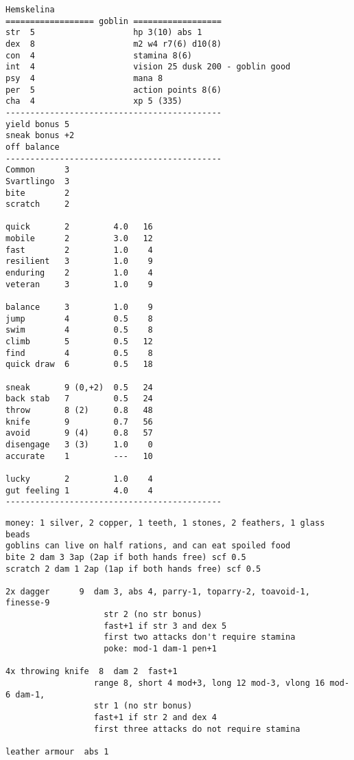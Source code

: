 \begin{verbatim}
\end{verbatim} \pagebreak[2] \begin{verbatim}
Hemskelina
================== goblin ==================
str  5                    hp 3(10) abs 1
dex  8                    m2 w4 r7(6) d10(8)
con  4                    stamina 8(6)
int  4                    vision 25 dusk 200 - goblin good
psy  4                    mana 8
per  5                    action points 8(6)
cha  4                    xp 5 (335)
--------------------------------------------
yield bonus 5
sneak bonus +2
off balance
--------------------------------------------
Common      3
Svartlingo  3
bite        2
scratch     2

quick       2         4.0   16
mobile      2         3.0   12
fast        2         1.0    4
resilient   3         1.0    9
enduring    2         1.0    4
veteran     3         1.0    9

balance     3         1.0    9
jump        4         0.5    8
swim        4         0.5    8
climb       5         0.5   12
find        4         0.5    8
quick draw  6         0.5   18

sneak       9 (0,+2)  0.5   24
back stab   7         0.5   24
throw       8 (2)     0.8   48
knife       9         0.7   56
avoid       9 (4)     0.8   57
disengage   3 (3)     1.0    0
accurate    1         ---   10

lucky       2         1.0    4
gut feeling 1         4.0    4
--------------------------------------------
\end{verbatim} \goodbreak \begin{verbatim}
money: 1 silver, 2 copper, 1 teeth, 1 stones, 2 feathers, 1 glass beads
goblins can live on half rations, and can eat spoiled food
bite 2 dam 3 3ap (2ap if both hands free) scf 0.5
scratch 2 dam 1 2ap (1ap if both hands free) scf 0.5

2x dagger      9  dam 3, abs 4, parry-1, toparry-2, toavoid-1, finesse-9
                    str 2 (no str bonus)
                    fast+1 if str 3 and dex 5
                    first two attacks don't require stamina
                    poke: mod-1 dam-1 pen+1

4x throwing knife  8  dam 2  fast+1
                  range 8, short 4 mod+3, long 12 mod-3, vlong 16 mod-6 dam-1,
                  str 1 (no str bonus)
                  fast+1 if str 2 and dex 4
                  first three attacks do not require stamina

leather armour  abs 1





\end{verbatim}
